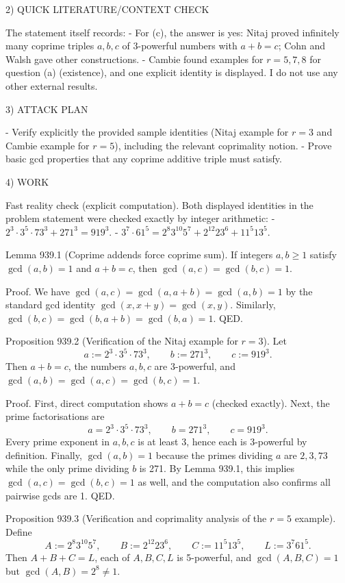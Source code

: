 2) QUICK LITERATURE/CONTEXT CHECK

The statement itself records:
- For (c), the answer is yes: Nitaj proved infinitely many coprime triples \(a,b,c\) of 3-powerful numbers with \(a+b=c\); Cohn and Walsh gave other constructions.
- Cambie found examples for \(r=5,7,8\) for question (a) (existence), and one explicit identity is displayed.
I do not use any other external results.

3) ATTACK PLAN

- Verify explicitly the provided sample identities (Nitaj example for \(r=3\) and Cambie example for \(r=5\)), including the relevant coprimality notion.
- Prove basic gcd properties that any coprime additive triple must satisfy.

4) WORK

Fast reality check (explicit computation).
Both displayed identities in the problem statement were checked exactly by integer arithmetic:
- \(2^3\cdot 3^5\cdot 73^3+271^3=919^3\).
- \(3^7\cdot 61^5=2^8 3^{10}5^7 +2^{12}23^6 +11^5 13^5\).

Lemma 939.1 (Coprime addends force coprime sum).
If integers \(a,b\ge 1\) satisfy \(\gcd(a,b)=1\) and \(a+b=c\), then \(\gcd(a,c)=\gcd(b,c)=1\).

Proof.
We have \(\gcd(a,c)=\gcd(a,a+b)=\gcd(a,b)=1\) by the standard gcd identity \(\gcd(x,x+y)=\gcd(x,y)\). Similarly, \(\gcd(b,c)=\gcd(b,a+b)=\gcd(b,a)=1\). QED.

Proposition 939.2 (Verification of the Nitaj example for \(r=3\)).
Let
\[a:=2^3\cdot 3^5\cdot 73^3,\qquad b:=271^3,\qquad c:=919^3.
\]
Then \(a+b=c\), the numbers \(a,b,c\) are 3-powerful, and \(\gcd(a,b)=\gcd(a,c)=\gcd(b,c)=1\).

Proof.
First, direct computation shows \(a+b=c\) (checked exactly).
Next, the prime factorisations are
\[a=2^3\cdot 3^5\cdot 73^3,\qquad b=271^3,\qquad c=919^3.
\]
Every prime exponent in \(a,b,c\) is at least 3, hence each is 3-powerful by definition.
Finally, \(\gcd(a,b)=1\) because the primes dividing \(a\) are \(2,3,73\) while the only prime dividing \(b\) is 271. By Lemma 939.1, this implies \(\gcd(a,c)=\gcd(b,c)=1\) as well, and the computation also confirms all pairwise gcds are 1. QED.

Proposition 939.3 (Verification and coprimality analysis of the \(r=5\) example).
Define
\[A:=2^8 3^{10}5^7,\qquad B:=2^{12}23^6,\qquad C:=11^5 13^5,\qquad L:=3^7 61^5.
\]
Then \(A+B+C=L\), each of \(A,B,C,L\) is 5-powerful, and \(\gcd(A,B,C)=1\) but \(\gcd(A,B)=2^8\ne 1\).

